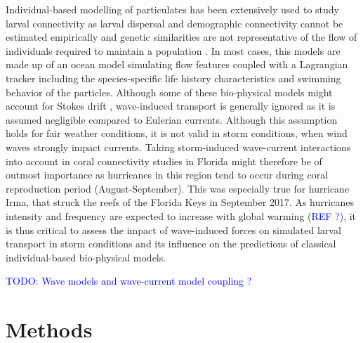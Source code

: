 \documentclass[11pt,a4paper]{article}
\begin{document}
Individual-based modelling of particulates has been extensively used to study larval connectivity \citep{figueiredo2013synthesizing,frys2020fine} as larval dispersal and demographic connectivity cannot be estimated empirically and genetic similarities are not representative of the flow of individuals required to maintain a population \citep{cowen2009larval}. In most cases, this models are made up of an ocean model simulating flow features coupled with a Lagrangian tracker including the species-specific life history characteristics and swimming behavior of the particles. Although some of these bio-physical models might account for Stokes drift \citep{fujimura2014numerical}, wave-induced transport is generally ignored as it is assumed negligible compared to Eulerian currents. Although this assumption holds for fair weather conditions, it is not valid in storm conditions, when wind waves strongly impact currents. Taking storm-induced wave-current interactions into account in coral connectivity studies in Florida might therefore be of outmost importance as hurricanes in this region tend to occur during coral reproduction period (August-September). This was especially true for hurricane Irma, that struck the reefs of the Florida Keys in September 2017. As hurricanes intensity and frequency are expected to increase with global warming (\textcolor{blue}{REF ?}), it is thus critical to assess the impact of wave-induced forces on simulated larval transport in storm conditions and its influence on the predictions of classical individual-based bio-physical models.

\textcolor{blue}{TODO: Wave models and wave-current model coupling ?}

\section{Methods}
\end{document}
